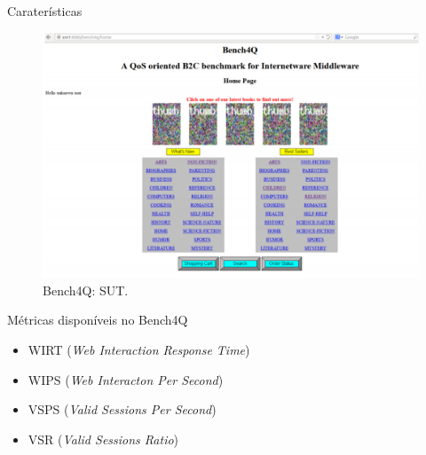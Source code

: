 \begin{frame}{Caraterísticas}
	\begin{figure}
		\begin{center}
			\includegraphics[scale=0.35]{images/sut.png}
			\caption{Bench4Q: SUT.}
			\label{fig:sut-bench4q}
		\end{center}
	\end{figure}
\end{frame}


\begin{frame}{Métricas disponíveis no Bench4Q}
\begin{itemize}
	\item WIRT (\textit{Web Interaction Response Time})
	\item WIPS (\textit{Web Interacton Per Second})
	\item VSPS (\textit{Valid Sessions Per Second})
	\item VSR (\textit{Valid Sessions Ratio})	
\end{itemize}

\end{frame}

